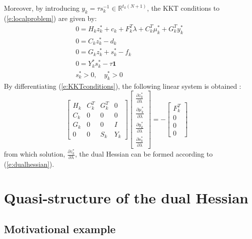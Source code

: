 Moreover, by introducing $y_k = \tau s_k^{-1} \in \mathbb{R}^{t_k (N + 1)}$, the KKT conditions to (\ref{e:localproblem}) are given by:
\begin{subequations} \label{e:KKTconditions}
\begin{align}
& 0 = H_k z_k^* + c_k + F_k^T \lambda + C_k^T \mu_k^* + G_k^T y_k^* \\
& 0 = C_k z_k^* - d_k \\
& 0 = G_k z_k^* + s_k^* - f_k \\
& 0 = Y_k^* s_k^* - \tau \mathbf{1} \\
& s_k^* > 0, \quad y_k^* > 0
\end{align}
\end{subequations}
By differentiating (\ref{e:KKTconditions}), the following linear system is obtained \cite{Klintberg2014}:
\begin{equation}
\label{e:SensitivityLambda}
\left[ \begin{array}{cccc}
H_k & C_k^T & G_k^T & 0 \\
C_k & 0 & 0 & 0 \\
G_k & 0 & 0 & I \\
0 & 0 & S_k & Y_k
\end{array} \right]
\left[ \begin{array}{c}
\frac{\partial z_k^*}{\partial \lambda} \\
\frac{\partial \mu_k^*}{\partial \lambda} \\
\frac{\partial y_k^*}{\partial \lambda} \\
\frac{\partial s_k^*}{\partial \lambda}
\end{array} \right] = -
\left[ \begin{array}{c}
F_k^T \\
0 \\
0 \\
0
\end{array} \right]
\end{equation}
from which solution, $\frac{\partial z_k^*}{\partial \lambda}$, the dual Hessian can be formed according to (\ref{e:dualhessian}).


\section{Quasi-structure of the dual Hessian} \label{S:TheoreticalDecay}

\subsection{Motivational example}

